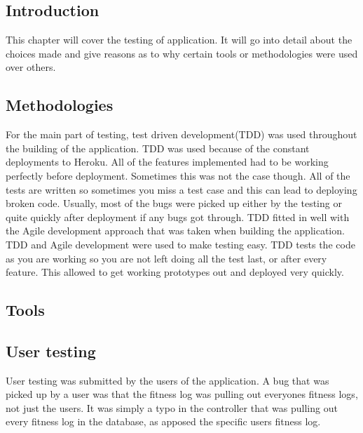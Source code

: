 \subsection{Introduction}
This chapter will cover the testing of application. It will go into detail about the choices made and give reasons as to why certain tools or methodologies were used over others.\\

\subsection{Methodologies}
For the main part of testing, test driven development(TDD) was used throughout the building of the application. TDD was used because of the constant deployments to Heroku. All of the features implemented had to be working perfectly before deployment. Sometimes this was not the case though. All of the tests are written so sometimes you miss a test case and this can lead to deploying broken code. Usually, most of the bugs were picked up either by the testing or quite quickly after deployment if any bugs got through. TDD fitted in well with the Agile development approach that was taken when building the application. TDD and Agile development were used to make testing easy. TDD tests the code as you are working so you are not left doing all the test last, or after every feature. This allowed to get working prototypes out and deployed very quickly.\\

\subsection{Tools}
\subsection{User testing}
User testing was submitted by the users of the application.
A bug that was picked up by a user was that the fitness log was pulling out everyones fitness logs, not just the users. It was simply a typo in the controller that was pulling out every fitness log in the database, as apposed the specific users fitness log.